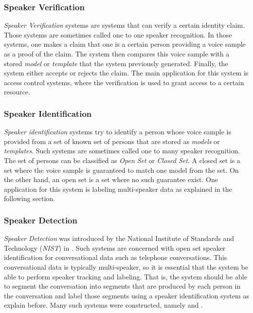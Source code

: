 \documentclass[twocolumn]{article}
\begin{document}
\subsubsection{Speaker Verification}

\emph{Speaker Verification} systems are systems that can verify a certain
identity claim. Those systems are sometimes called one to one speaker
recognition. In those systems, one makes a claim that one is a certain person
providing a voice sample as a proof of the claim. The system then compares this
voice sample with a stored \emph{model} or \emph{template} that the system
previously generated. Finally, the system either accepts or rejects the claim.
The main application for this system is access control systems, where the
verification is used to grant access to a certain resource.

\subsubsection{Speaker Identification}

\emph{Speaker identification} systems try to identify a person whose voice
sample is provided from a set of known set of persons that are stored as
\emph{models} or \emph{templates}.  Such systems are sometimes called one to
many speaker recognition. The set of persons can be classified as \emph{Open
Set} or \emph{Closed Set}. A closed set is a set where the voice sample is
guaranteed to match one model from the set. On the other hand, an open set is a
set where no such guarantee exist. One application for this system is labeling
multi-speaker data as explained in the following section.

\subsubsection{Speaker Detection}

\emph{Speaker Detection} was introduced by the National Institute of Standards
and Technology (\emph{NIST}) in \autocite{Przybocki1999}. Such systems are
concerned with open set speaker identification for conversational data such as
telephone conversations. This conversational data is typically multi-speaker,
so it is essential that the system be able to perform speaker tracking and
labeling. That is, the system should be able to segment the conversation into
segments that are produced by each person in the conversation and label those
segments using a speaker identification system as explain before. Many such
systems were constructed, namely \autocite{Wilcox1994} and
\autocite{Delacourt2000}.
\end{document}
